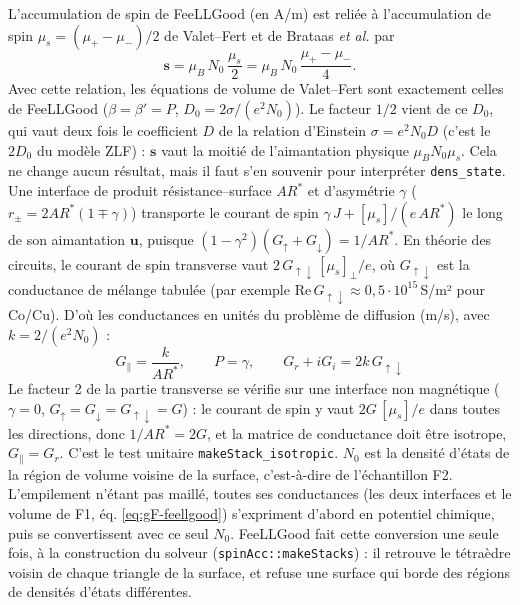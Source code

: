 \documentclass[11pt,a4paper]{article}
\newcommand{\vs}{\bm{s}}
\begin{document}
L'accumulation de spin de FeeLLGood (en A/m) est reliée à l'accumulation
de spin $\mu_s = (\mu_+-\mu_-)/2$ de Valet--Fert et de Brataas \emph{et
al.} par
\begin{equation}
  \vs = \mu_B\,N_0\,\frac{\mu_s}{2} = \mu_B\,N_0\,\frac{\mu_+-\mu_-}{4}.
\end{equation}
Avec cette relation, les équations de volume de Valet--Fert sont exactement
celles de FeeLLGood ($\beta=\beta'=P$, $D_0 = 2\sigma/(e^2N_0)$). Le
facteur $1/2$ vient de ce $D_0$, qui vaut deux fois le coefficient $D$ de
la relation d'Einstein $\sigma = e^2N_0D$ (c'est le \og $2D_0$ \fg{} du
modèle ZLF) : $\vs$ vaut la moitié de l'aimantation physique
$\mu_BN_0\mu_s$. Cela ne change aucun résultat, mais il faut s'en
souvenir pour interpréter \texttt{dens\_state}. Une
interface de produit résistance--surface $AR^*$ et d'asymétrie $\gamma$
($r_{\pm} = 2AR^*(1\mp\gamma)$) transporte le courant de spin
$\gamma\,J + [\mu_s]/(e\,AR^*)$ le long de son aimantation $\bm{u}$,
puisque $(1-\gamma^2)(G_\uparrow+G_\downarrow) = 1/AR^*$. En théorie des
circuits, le courant de spin transverse vaut
$2\,G_{\uparrow\downarrow}\,[\mu_s]_\perp/e$, où $G_{\uparrow\downarrow}$
est la conductance de mélange tabulée (par exemple
$\mathrm{Re}\,G_{\uparrow\downarrow}\approx0{,}5\cdot10^{15}$\,S/m² pour
Co/Cu). D'où les conductances en unités du problème de diffusion (m/s),
avec $k = 2/(e^2N_0)$ :
\begin{equation}
  \boxed{\;
  G_\parallel = \frac{k}{AR^*},\qquad
  P = \gamma,\qquad
  G_r + iG_i = 2k\,G_{\uparrow\downarrow}
  \;}
  \label{eq:conversion}
\end{equation}
Le facteur 2 de la partie transverse se vérifie sur une interface non
magnétique ($\gamma=0$, $G_\uparrow = G_\downarrow = G_{\uparrow\downarrow}
= G$) : le courant de spin y vaut $2G\,[\mu_s]/e$ dans toutes les
directions, donc $1/AR^* = 2G$, et la matrice de conductance doit être
isotrope, $G_\parallel = G_r$. C'est le test unitaire
\texttt{makeStack\_isotropic}.
$N_0$ est la densité d'états de la région de volume voisine de la surface,
c'est-à-dire de l'échantillon F2. L'empilement n'étant pas maillé, toutes
ses conductances (les deux interfaces et le volume de F1, éq.
\eqref{eq:gF-feellgood}) s'expriment d'abord en potentiel chimique, puis se
convertissent avec ce seul $N_0$. FeeLLGood fait cette conversion une seule
fois, à la construction du solveur (\texttt{spinAcc::makeStacks}) : il
retrouve le tétraèdre voisin de chaque triangle de la surface, et refuse
une surface qui borde des régions de densités d'états différentes.
\end{document}
